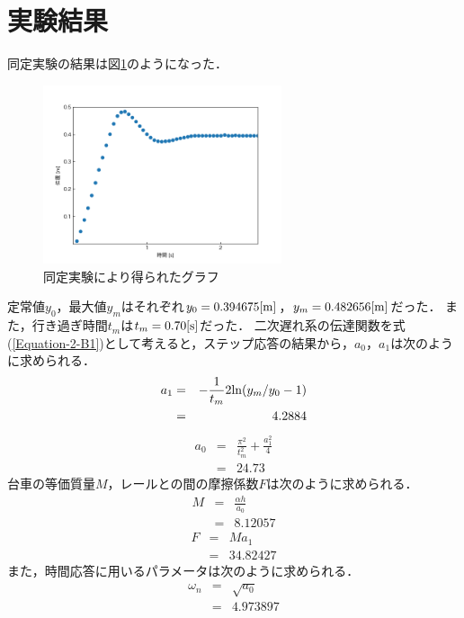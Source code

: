 \documentclass[12pt]{jsarticle}
\begin{document}
\section{実験結果}
同定実験の結果は図\ref{Figure-doutei}のようになった．
\begin{figure}[tb]
  \begin{center}
    \includegraphics[clip,width=7.0cm]{../img/doutei.png}
    \caption{同定実験により得られたグラフ}
    \label{Figure-doutei}
  \end{center}
\end{figure}
定常値$y_0$，最大値$y_m$はそれぞれ$y_0=0.394675{\rm [m]}$，$y_m=0.482656{\rm [m]}$だった．
また，行き過ぎ時間$t_m$は$t_m=0.70{\rm [s]}$だった．
二次遅れ系の伝達関数を式(\ref{Equation-2-B1})として考えると，ステップ応答の結果から，$a_0$，$a_1$は次のように求められる．
\begin{eqnarray}
  \label{StepResponse_calculate_a1}
  a_1 &=& -\frac{1}{t_m}2{\rm ln}(y_m/y_0 - 1) \\
      &=& 4.2884 \nonumber
\end{eqnarray}
\begin{eqnarray}
  \label{StepResponse_calculate_a0}
  a_0 &=& \frac{\pi^2}{t_m^2} + \frac{a_1^2}{4} \\
      &=& 24.73 \nonumber
\end{eqnarray}
台車の等価質量$M$，レールとの間の摩擦係数$F$は次のように求められる．
\begin{eqnarray}
  \label{StepResponse_calculate_M}
  M &=& \frac{\alpha h}{a_0} \\
    &=& 8.12057 \nonumber
\end{eqnarray}
\begin{eqnarray}
  \label{StepResponse_calculate_F}
  F &=& M a_1\\
    &=& 34.82427 \nonumber
\end{eqnarray}
また，時間応答に用いるパラメータは次のように求められる．
\begin{eqnarray}
  \label{StepResponse_calculate_omega_n}
  \omega_n &=& \sqrt{a_0} \\
           &=& 4.973897 \nonumber
\end{eqnarray}
\end{document}
